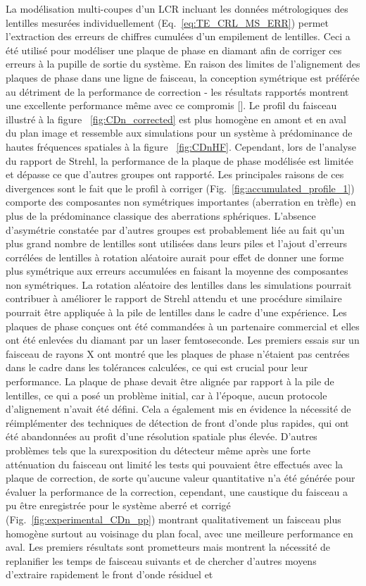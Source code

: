 \begin{refsection}
La modélisation multi-coupes d'un LCR incluant les données métrologiques des lentilles mesurées individuellement (Eq.~\ref{eq:TE_CRL_MS_ERR}) permet l'extraction des erreurs de chiffres cumulées d'un empilement de lentilles. Ceci a été utilisé pour modéliser une plaque de phase en diamant afin de corriger ces erreurs à la pupille de sortie du système. En raison des limites de l'alignement des plaques de phase dans une ligne de faisceau, la conception symétrique est préférée au détriment de la performance de correction - les résultats rapportés montrent une excellente performance même avec ce compromis [\cite{Seiboth2020,Dhamgaye2020}]. Le profil du faisceau illustré à la figure ~\ref{fig:CDn_corrected} est plus homogène en amont et en aval du plan image et ressemble aux simulations pour un système à prédominance de hautes fréquences spatiales à la figure ~\ref{fig:CDnHF}. Cependant, lors de l'analyse du rapport de Strehl, la performance de la plaque de phase modélisée est limitée et dépasse ce que d'autres groupes ont rapporté. Les principales raisons de ces divergences sont le fait que le profil à corriger (Fig.~\ref{fig:accumulated_profile_1}) comporte des composantes non symétriques importantes (aberration en trèfle) en plus de la prédominance classique des aberrations sphériques. L'absence d'asymétrie constatée par d'autres groupes est probablement liée au fait qu'un plus grand nombre de lentilles sont utilisées dans leurs piles et l'ajout d'erreurs corrélées de lentilles à rotation aléatoire aurait pour effet de donner une forme plus symétrique aux erreurs accumulées en faisant la moyenne des composantes non symétriques. La rotation aléatoire des lentilles dans les simulations pourrait contribuer à améliorer le rapport de Strehl attendu et une procédure similaire pourrait être appliquée à la pile de lentilles dans le cadre d'une expérience. Les plaques de phase conçues ont été commandées à un partenaire commercial et elles ont été enlevées du diamant par un laser femtoseconde. Les premiers essais sur un faisceau de rayons X ont montré que les plaques de phase n'étaient pas centrées dans le cadre dans les tolérances calculées, ce qui est crucial pour leur performance. La plaque de phase devait être alignée par rapport à la pile de lentilles, ce qui a posé un problème initial, car à l'époque, aucun protocole d'alignement n'avait été défini. Cela a également mis en évidence la nécessité de réimplémenter des techniques de détection de front d'onde plus rapides, qui ont été abandonnées au profit d'une résolution spatiale plus élevée. D'autres problèmes tels que la surexposition du détecteur même après une forte atténuation du faisceau ont limité les tests qui pouvaient être effectués avec la plaque de correction, de sorte qu'aucune valeur quantitative n'a été générée pour évaluer la performance de la correction, cependant, une caustique du faisceau a pu être enregistrée pour le système aberré et corrigé (Fig.~\ref{fig:experimental_CDn_pp}) montrant qualitativement un faisceau plus homogène surtout au voisinage du plan focal, avec une meilleure performance en aval. Les premiers résultats sont prometteurs mais montrent la nécessité de replanifier les temps de faisceau suivants et de chercher d'autres moyens d'extraire rapidement le front d'onde résiduel et 
\end{refsection}
